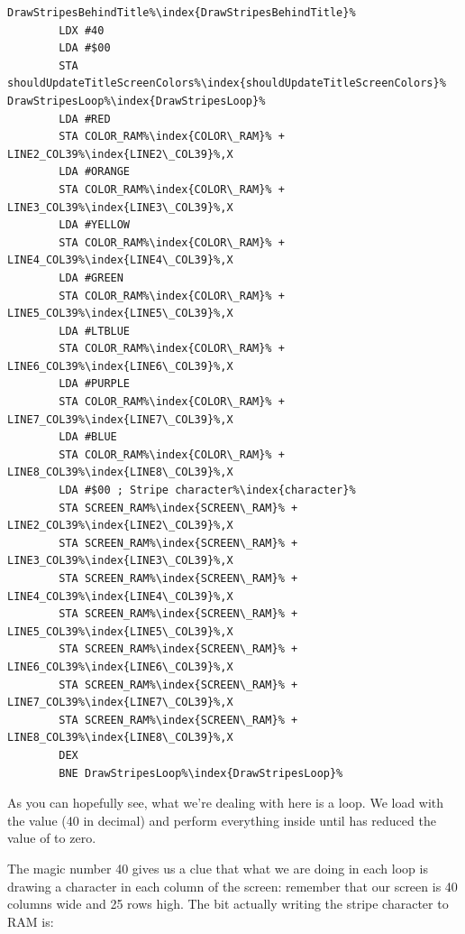 \begin{lstlisting}[caption=Drawing stripes using a loop!,escapechar=\%]
DrawStripesBehindTitle%\index{DrawStripesBehindTitle}%
        LDX #40
        LDA #$00
        STA shouldUpdateTitleScreenColors%\index{shouldUpdateTitleScreenColors}%
DrawStripesLoop%\index{DrawStripesLoop}%   
        LDA #RED
        STA COLOR_RAM%\index{COLOR\_RAM}% + LINE2_COL39%\index{LINE2\_COL39}%,X
        LDA #ORANGE
        STA COLOR_RAM%\index{COLOR\_RAM}% + LINE3_COL39%\index{LINE3\_COL39}%,X
        LDA #YELLOW
        STA COLOR_RAM%\index{COLOR\_RAM}% + LINE4_COL39%\index{LINE4\_COL39}%,X
        LDA #GREEN
        STA COLOR_RAM%\index{COLOR\_RAM}% + LINE5_COL39%\index{LINE5\_COL39}%,X
        LDA #LTBLUE
        STA COLOR_RAM%\index{COLOR\_RAM}% + LINE6_COL39%\index{LINE6\_COL39}%,X
        LDA #PURPLE
        STA COLOR_RAM%\index{COLOR\_RAM}% + LINE7_COL39%\index{LINE7\_COL39}%,X
        LDA #BLUE
        STA COLOR_RAM%\index{COLOR\_RAM}% + LINE8_COL39%\index{LINE8\_COL39}%,X
        LDA #$00 ; Stripe character%\index{character}%
        STA SCREEN_RAM%\index{SCREEN\_RAM}% + LINE2_COL39%\index{LINE2\_COL39}%,X
        STA SCREEN_RAM%\index{SCREEN\_RAM}% + LINE3_COL39%\index{LINE3\_COL39}%,X
        STA SCREEN_RAM%\index{SCREEN\_RAM}% + LINE4_COL39%\index{LINE4\_COL39}%,X
        STA SCREEN_RAM%\index{SCREEN\_RAM}% + LINE5_COL39%\index{LINE5\_COL39}%,X
        STA SCREEN_RAM%\index{SCREEN\_RAM}% + LINE6_COL39%\index{LINE6\_COL39}%,X
        STA SCREEN_RAM%\index{SCREEN\_RAM}% + LINE7_COL39%\index{LINE7\_COL39}%,X
        STA SCREEN_RAM%\index{SCREEN\_RAM}% + LINE8_COL39%\index{LINE8\_COL39}%,X
        DEX
        BNE DrawStripesLoop%\index{DrawStripesLoop}%

\end{lstlisting}

As you can hopefully see, what we're dealing with here is a loop. We load  with the value  (40 in decimal)
and perform everything inside  until  has reduced the value of  to zero.

The magic number 40 gives us a clue that what we are doing in each loop is drawing a character in each column of the screen:
remember that our screen is 40 columns wide and 25 rows high. The bit actually writing the stripe character to RAM is:

